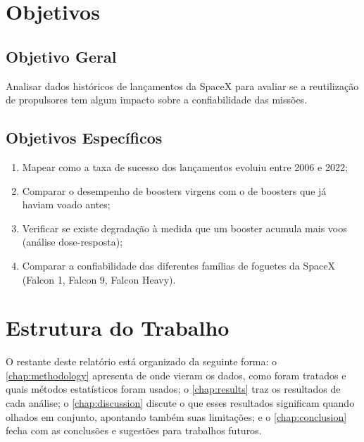 \section{Objetivos}

\subsection{Objetivo Geral}

Analisar dados históricos de lançamentos da SpaceX para avaliar se a reutilização de propulsores tem algum impacto sobre a confiabilidade das missões.

\subsection{Objetivos Específicos}

\begin{enumerate}
    \item Mapear como a taxa de sucesso dos lançamentos evoluiu entre 2006 e 2022;
    \item Comparar o desempenho de boosters virgens com o de boosters que já haviam voado antes;
    \item Verificar se existe degradação à medida que um booster acumula mais voos (análise dose-resposta);
    \item Comparar a confiabilidade das diferentes famílias de foguetes da SpaceX (Falcon 1, Falcon 9, Falcon Heavy).
\end{enumerate}

\section{Estrutura do Trabalho}

O restante deste relatório está organizado da seguinte forma: o \autoref{chap:methodology} apresenta de onde vieram os dados, como foram tratados e quais métodos estatísticos foram usados; o \autoref{chap:results} traz os resultados de cada análise; o \autoref{chap:discussion} discute o que esses resultados significam quando olhados em conjunto, apontando também suas limitações; e o \autoref{chap:conclusion} fecha com as conclusões e sugestões para trabalhos futuros.
